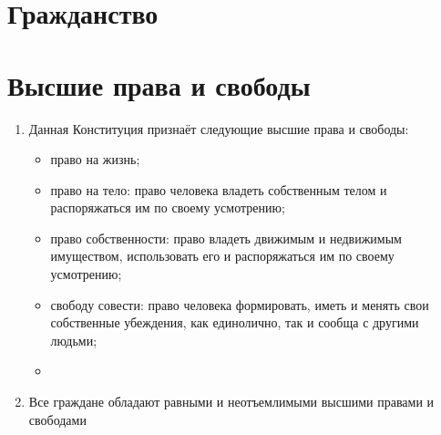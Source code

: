 
\section{Гражданство}

\section{Высшие права и свободы}
\begin{enumerate}
    \item Данная Конституция признаёт следующие высшие права и свободы:
    \begin{itemize}
        \item право на жизнь;
         \item право на тело: право человека владеть собственным телом и распоряжаться им по своему усмотрению;
         \item право собственности: право владеть движимым и недвижимым имуществом, использовать его и распоряжаться им по своему усмотрению;
         \item свободу совести: право человека формировать, иметь и менять свои собственные убеждения, как единолично, так и сообща с другими людьми;
         \item   
    \end{itemize}
    \item Все граждане обладают равными и неотъемлимыми высшими правами и свободами
\end{enumerate}